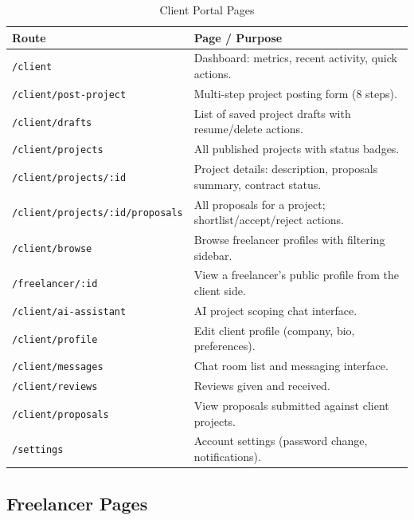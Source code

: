 \begin{table}[H]
\centering
\caption{Client Portal Pages}
\begin{tabularx}{\textwidth}{lX}
\toprule
\textbf{Route} & \textbf{Page / Purpose} \\
\midrule
\texttt{/client}                         & Dashboard: metrics, recent activity, quick actions. \\
\texttt{/client/post-project}            & Multi-step project posting form (8 steps). \\
\texttt{/client/drafts}                  & List of saved project drafts with resume/delete actions. \\
\texttt{/client/projects}               & All published projects with status badges. \\
\texttt{/client/projects/:id}           & Project details: description, proposals summary, contract status. \\
\texttt{/client/projects/:id/proposals} & All proposals for a project; shortlist/accept/reject actions. \\
\texttt{/client/browse}                 & Browse freelancer profiles with filtering sidebar. \\
\texttt{/freelancer/:id}                & View a freelancer's public profile from the client side. \\
\texttt{/client/ai-assistant}           & AI project scoping chat interface. \\
\texttt{/client/profile}               & Edit client profile (company, bio, preferences). \\
\texttt{/client/messages}              & Chat room list and messaging interface. \\
\texttt{/client/reviews}              & Reviews given and received. \\
\texttt{/client/proposals}            & View proposals submitted against client projects. \\
\texttt{/settings}                    & Account settings (password change, notifications). \\
\bottomrule
\end{tabularx}
\end{table}

\subsection{Freelancer Pages}

